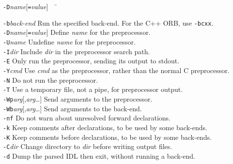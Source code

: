 \documentclass[11pt,twoside,a4paper]{book}
\newcommand{\cmdline}[1]{\texttt{#1}}
\begin{document}
\begin{tabbing}
\cmdline{-D}\textit{name}[\cmdline{=}\textit{value}]~~ \= \kill

\cmdline{-b}\textit{back-end}
     \> Run the specified back-end. For the C++ ORB, use \cmdline{-bcxx}.\\

\cmdline{-D}\textit{name}[\cmdline{=}\textit{value}]
     \> Define \textit{name} for the preprocessor.\\

\cmdline{-U}\textit{name}
     \> Undefine \textit{name} for the preprocessor.\\

\cmdline{-I}\textit{dir}
     \> Include \textit{dir} in the preprocessor search path.\\

\cmdline{-E}
     \> Only run the preprocessor, sending its output to stdout.\\

\cmdline{-Y}\textit{cmd}
     \> Use \textit{cmd} as the preprocessor, rather than the normal C
        preprocessor.\\

\cmdline{-N}
     \> Do not run the preprocessor.\\

\cmdline{-T}
     \> Use a temporary file, not a pipe, for preprocessor output.\\

\cmdline{-Wp}\textit{arg}[,\textit{arg}\dots]
     \> Send arguments to the preprocessor.\\

\cmdline{-Wb}\textit{arg}[,\textit{arg}\dots]
     \> Send arguments to the back-end.\\

\cmdline{-nf}
     \> Do not warn about unresolved forward declarations.\\

\cmdline{-k}
     \> Keep comments after declarations, to be used by some back-ends.\\

\cmdline{-K}
     \> Keep comments before declarations, to be used by some back-ends.\\

\cmdline{-C}\textit{dir}
     \> Change directory to \textit{dir} before writing output files.\\

\cmdline{-d}
     \> Dump the parsed IDL then exit, without running a back-end.\\


\end{tabbing}
\end{document}
